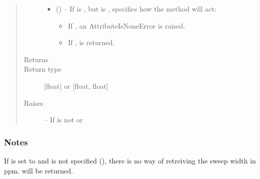\documentclass[letterpaper,10pt,english]{sphinxmanual}
\begin{document}
\begin{fulllineitems}
\begin{fulllineitems}
\begin{quote}
\begin{description}
\begin{itemize}
\item {} 
\sphinxAtStartPar
{} (\sphinxstyleliteralemphasis{\sphinxupquote{, }}) – 
\sphinxAtStartPar
If  is , but  is ,  specifies
how the method will act:
\begin{itemize}
\item {} 
\sphinxAtStartPar
If , an AttributeIsNoneError is raised.

\item {} 
\sphinxAtStartPar
If ,  is returned.

\end{itemize}


\end{itemize}

\item[{Returns}] \leavevmode
\sphinxAtStartPar
{}

\item[{Return type}] \leavevmode
\sphinxAtStartPar
{[}float{]} or {[}float, float{]}

\item[{Raises}] \leavevmode
\sphinxAtStartPar
{\hyperref[\detokenize{references/errors:nmrespy._errors.InvalidUnitError}]{}} – If  is not  or 

\end{description}\end{quote}
\subsubsection*{Notes}

\sphinxAtStartPar
If  is set to  and  is not specified
(), there is no way of retreiving the sweep width in ppm.
 will be returned.

\end{fulllineitems}



\end{fulllineitems}
\end{document}
